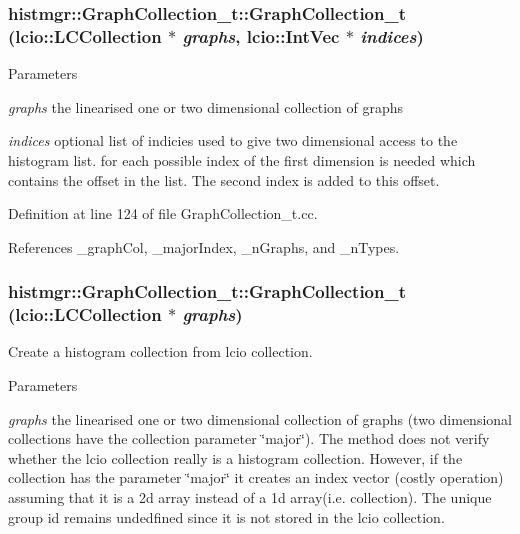\subsubsection[{GraphCollection\_\-t}]{\setlength{\rightskip}{0pt plus 5cm}histmgr::GraphCollection\_\-t::GraphCollection\_\-t (lcio::LCCollection $\ast$ {\em graphs}, \/  lcio::IntVec $\ast$ {\em indices})}\label{classhistmgr_1_1GraphCollection__t_a740ae9b62df86330c2734fdf061b119a}

\begin{DoxyParams}{Parameters}
\item[{\em graphs}]the linearised one or two dimensional collection of graphs \item[{\em indices}]optional list of indicies used to give two dimensional access to the histogram list. for each possible index of the first dimension is needed which contains the offset in the list. The second index is added to this offset. \end{DoxyParams}


Definition at line 124 of file GraphCollection\_\-t.cc.

References \_\-graphCol, \_\-majorIndex, \_\-nGraphs, and \_\-nTypes.
\subsubsection[{GraphCollection\_\-t}]{\setlength{\rightskip}{0pt plus 5cm}histmgr::GraphCollection\_\-t::GraphCollection\_\-t (lcio::LCCollection $\ast$ {\em graphs})}\label{classhistmgr_1_1GraphCollection__t_a1f8d2f420b8735f4ff9ae71d976f6622}


Create a histogram collection from lcio collection. 
\begin{DoxyParams}{Parameters}
\item[{\em graphs}]the linearised one or two dimensional collection of graphs (two dimensional collections have the collection parameter \char`\"{}major\char`\"{}). The method does not verify whether the lcio collection really is a histogram collection. However, if the collection has the parameter \char`\"{}major\char`\"{} it creates an index vector (costly operation) assuming that it is a 2d array instead of a 1d array(i.e. collection). The unique group id remains undedfined since it is not stored in the lcio collection. \end{DoxyParams}


